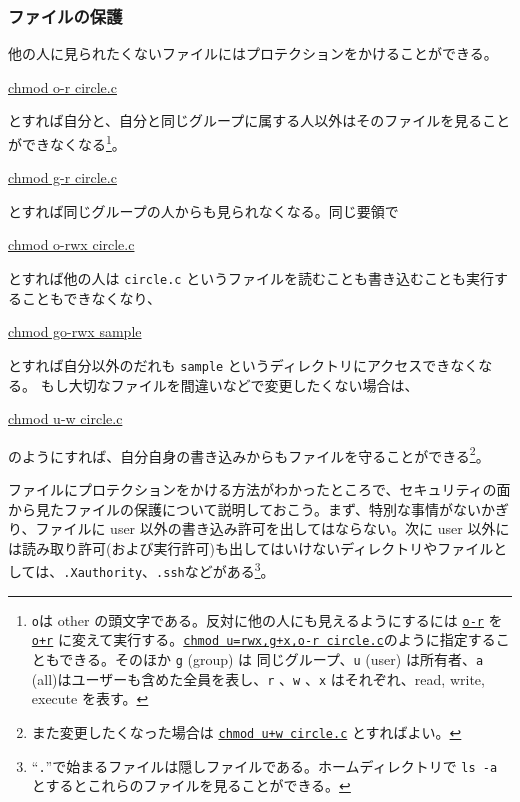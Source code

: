 \subsubsection*{ファイルの保護}
他の人に見られたくないファイルにはプロテクションをかけることができる。
\begin{commandline2}
\prompt \underline{chmod o-r circle.c}
\end{commandline2} \noindent
とすれば自分と、自分と同じグループに属する人以外はそのファイルを見ることができなくなる\footnote{{\tt o}は other の頭文字である。反対に他の人にも見えるようにするには \underline{\tt o-r} を\underline{\tt o+r} に変えて実行する。\underline{\tt chmod u=rwx,g+x,o-r circle.c}のように指定することもできる。そのほか {\tt g} (group) は 同じグループ、{\tt u} (user) は所有者、{\tt a} (all)はユーザーも含めた全員を表し、{\tt r} 、{\tt w} 、{\tt x} はそれぞれ、read, write, execute を表す。}。
\begin{commandline2}
\prompt \underline{chmod g-r circle.c}
\end{commandline2} \noindent
とすれば同じグループの人からも見られなくなる。同じ要領で
\begin{commandline2}
\prompt \underline{chmod o-rwx circle.c}
\end{commandline2} \noindent
とすれば他の人は {\tt circle.c} というファイルを読むことも書き込むことも実行することもできなくなり、
\begin{commandline2}
\prompt \underline{chmod go-rwx sample}
\end{commandline2} \noindent
とすれば自分以外のだれも {\tt sample} というディレクトリにアクセスできなくなる。
もし大切なファイルを間違いなどで変更したくない場合は、
\begin{commandline2}
\prompt \underline{chmod u-w circle.c}
\end{commandline2} \noindent
のようにすれば、自分自身の書き込みからもファイルを守ることができる\footnote{また変更したくなった場合は \underline{\tt chmod u+w circle.c} とすればよい。}。

ファイルにプロテクションをかける方法がわかったところで、セキュリティの面から見たファイルの保護について説明しておこう。まず、特別な事情がないかぎり、ファイルに user 以外の書き込み許可を出してはならない。次に user 以外には読み取り許可(および実行許可)も出してはいけないディレクトリやファイルとしては、{\tt .Xauthority}、{\tt .ssh}などがある\footnote{``{\tt .}''で始まるファイルは隠しファイルである。ホームディレクトリで {\tt ls -a} とするとこれらのファイルを見ることができる。}。

